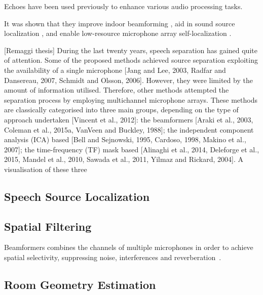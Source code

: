 Echoes have been used previously to enhance various audio processing tasks.

It was shown that they improve indoor beamforming ,
aid in sound source localization ,
and enable low-resource microphone array self-localization .

[Remaggi thesis]
During the last twenty years, speech separation has gained quite of attention. Some of the proposed methods achieved source separation exploiting the availability of a single microphone [Jang and Lee, 2003, Radfar and Dansereau, 2007, Schmidt and Olsson, 2006]. However, they were limited by the amount of information utilised. Therefore, other methods attempted the separation process by employing multichannel microphone arrays. These methods are classically categorised into three main groups, depending on the type of approach undertaken [Vincent et al., 2012]: the beamformers [Araki et al., 2003, Coleman et al., 2015a, VanVeen and Buckley, 1988]; the independent component analysis (ICA) based [Bell and Sejnowski, 1995, Cardoso, 1998, Makino et al., 2007]; the time-frequency (TF) mask based [Alinaghi et al., 2014, Deleforge et al., 2015, Mandel et al., 2010, Sawada et al., 2011, Yilmaz and Rickard, 2004]. A visualisation of these three

\subsection{Speech Source Localization}
\subsection{Spatial Filtering}
Beamformers combines the channels of multiple microphones in order to achieve spatial selectivity, suppressing noise, interferences and reverberation~.

\subsection{Room Geometry Estimation}